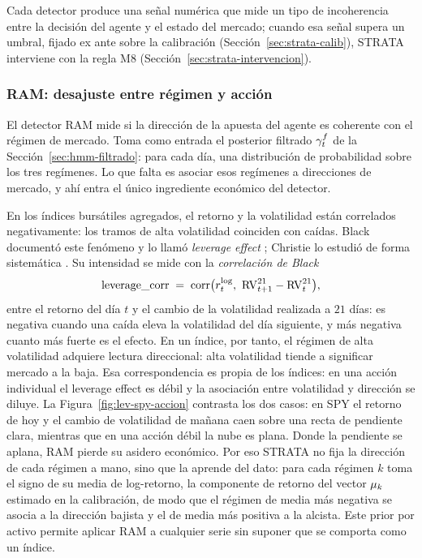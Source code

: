 Cada detector produce una señal numérica que mide un tipo de incoherencia entre la decisión del agente y el estado del mercado; cuando esa señal supera un umbral, fijado ex ante sobre la calibración (Sección~\ref{sec:strata-calib}), STRATA interviene con la regla M8 (Sección~\ref{sec:strata-intervencion}).

\subsubsection{RAM: desajuste entre régimen y acción}
\label{sec:strata-ram}

El detector RAM mide si la dirección de la apuesta del agente es coherente con el régimen de mercado. Toma como entrada el posterior filtrado $\gamma^{f}_t$ de la Sección~\ref{sec:hmm-filtrado}: para cada día, una distribución de probabilidad sobre los tres regímenes. Lo que falta es asociar esos regímenes a direcciones de mercado, y ahí entra el único ingrediente económico del detector.

En los índices bursátiles agregados, el retorno y la volatilidad están correlados negativamente: los tramos de alta volatilidad coinciden con caídas. Black documentó este fenómeno y lo llamó \emph{leverage effect} \cite{black1976}; Christie lo estudió de forma sistemática \cite{christie1982}. Su intensidad se mide con la \emph{correlación de Black}
\[
\mathrm{leverage\_corr} \;=\; \operatorname{corr}\!\big(r_t^{\log},\ \mathrm{RV}^{21}_{t+1} - \mathrm{RV}^{21}_t\big),
\]
entre el retorno del día $t$ y el cambio de la volatilidad realizada a $21$ días: es negativa cuando una caída eleva la volatilidad del día siguiente, y más negativa cuanto más fuerte es el efecto. En un índice, por tanto, el régimen de alta volatilidad adquiere lectura direccional: alta volatilidad tiende a significar mercado a la baja. Esa correspondencia es propia de los índices: en una acción individual el leverage effect es débil y la asociación entre volatilidad y dirección se diluye. La Figura~\ref{fig:lev-spy-accion} contrasta los dos casos: en SPY el retorno de hoy y el cambio de volatilidad de mañana caen sobre una recta de pendiente clara, mientras que en una acción débil la nube es plana. Donde la pendiente se aplana, RAM pierde su asidero económico. Por eso STRATA no fija la dirección de cada régimen a mano, sino que la aprende del dato: para cada régimen $k$ toma el signo de su media de log-retorno, la componente de retorno del vector $\mu_k$ estimado en la calibración, de modo que el régimen de media más negativa se asocia a la dirección bajista y el de media más positiva a la alcista. Este prior por activo permite aplicar RAM a cualquier serie sin suponer que se comporta como un índice.

